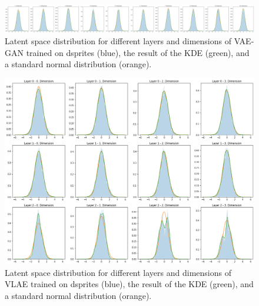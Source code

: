 \begin{figure}[H]
    \centering
    \includegraphics[width=\textwidth]{images/generated_vs_true/dsprites/vae_gan_kde.png}
    \caption[\ac{VAE}-\ac{GAN} on dsprites: Estimated Latent Space Distribution]{Latent space distribution for different layers and dimensions of \ac{VAE}-\ac{GAN} trained on dsprites (blue), the result of the \ac{KDE} (green), and a standard normal distribution (orange).}
\end{figure}


\begin{figure}[H]
    \centering
    \includegraphics[width=\textwidth]{images/generated_vs_true/dsprites/vlae_kde.png}
    \caption[\ac{VLAE} on dsprites: Estimated Latent Space Distribution]{Latent space distribution for different layers and dimensions of \ac{VLAE} trained on dsprites (blue), the result of the \ac{KDE} (green), and a standard normal distribution (orange).}
\end{figure}

